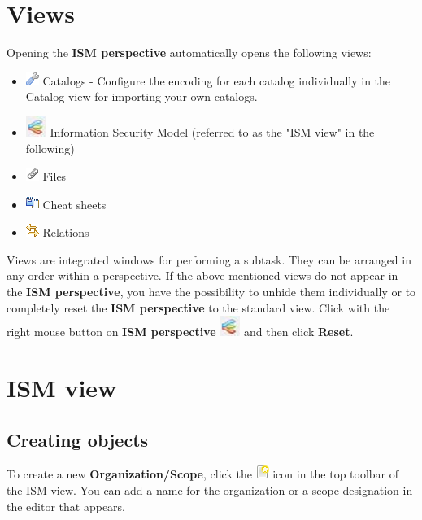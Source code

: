 \documentclass[a4paper,10pt]{book}
\begin{document}
\section{Views}
Opening the \textbf{ISM perspective} automatically opens the following views:
\begin{itemize}
\item \includegraphics[height=2ex]{Icon/Control_Kataloge.png} Catalogs - Configure the encoding for each catalog individually in the Catalog view for importing your own catalogs.
\item \includegraphics[height=2ex]{Icon/Informationssicherheitsmodell.png} Information Security Model (referred to as the "ISM view" in the following)
\item \includegraphics[height=2ex]{Icon/Hinzufuegen.png} Files
\item \includegraphics[height=2ex]{Icon/Cheatsheet_view.png} Cheat sheets
\item \includegraphics[height=2ex]{Icon/Verknuepfungen.png} Relations
\end{itemize}
Views are integrated windows for performing a subtask. They can be arranged in any order within a perspective. If the above-mentioned views do not appear in the \textbf{ISM perspective}, you have the possibility to unhide them individually or to completely reset the \textbf{ISM perspective} to the standard view. Click with the right mouse button on \textbf{ISM perspective}
 \includegraphics[height=2ex]{Icon/Informationssicherheitsmodell.png} and then click \textbf{Reset}.


\section{ISM view}
\subsection{Creating objects} \label{Creating objects}
To create a new \textbf{Organization/Scope}, click the \includegraphics[height=2ex]{Icon/Oeffnen.png}
icon in the top toolbar of the ISM view. You can add a name for the organization or a scope designation in the editor that appears.
\end{document}
